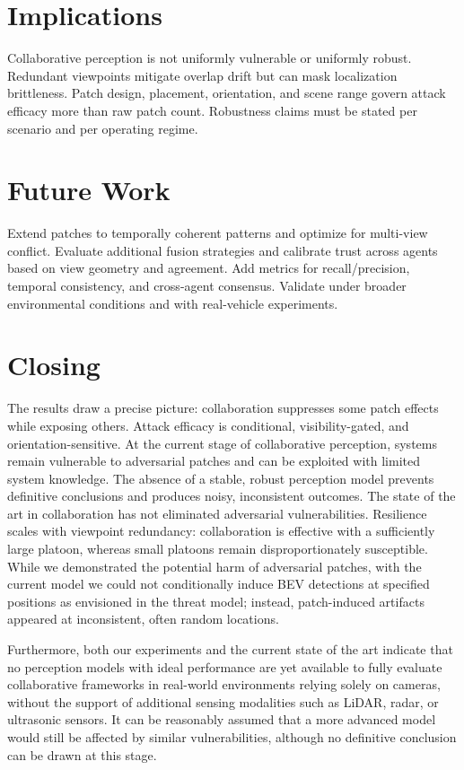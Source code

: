 \section{Implications}
Collaborative perception is not uniformly vulnerable or uniformly robust. Redundant viewpoints mitigate overlap drift but can mask localization brittleness. Patch design, placement, orientation, and scene range govern attack efficacy more than raw patch count. Robustness claims must be stated per scenario and per operating regime.

\section{Future Work}
Extend patches to temporally coherent patterns and optimize for multi-view conflict. Evaluate additional fusion strategies and calibrate trust across agents based on view geometry and agreement. Add metrics for recall/precision, temporal consistency, and cross-agent consensus. Validate under broader environmental conditions and with real-vehicle experiments.

\section{Closing}
The results draw a precise picture: collaboration suppresses some patch effects while exposing others.
Attack efficacy is conditional, visibility-gated, and orientation-sensitive.
At the current stage of collaborative perception, systems remain vulnerable to adversarial patches and can be exploited with limited system knowledge.
The absence of a stable, robust perception model prevents definitive conclusions and produces noisy, inconsistent outcomes.
The state of the art in collaboration has not eliminated adversarial vulnerabilities.
Resilience scales with viewpoint redundancy: collaboration is effective with a sufficiently large platoon, whereas small platoons remain disproportionately susceptible.
While we demonstrated the potential harm of adversarial patches, with the current model we could not conditionally induce BEV detections at specified positions as envisioned in the threat model; instead, patch-induced artifacts appeared at inconsistent, often random locations.

Furthermore, both our experiments and the current state of the art indicate that no perception models with ideal performance are yet available to fully evaluate collaborative frameworks in real-world environments relying solely on cameras, without the support of additional sensing modalities such as LiDAR, radar, or ultrasonic sensors.
It can be reasonably assumed that a more advanced model would still be affected by similar vulnerabilities, although no definitive conclusion can be drawn at this stage.